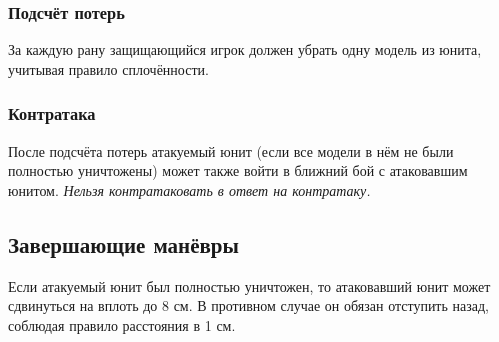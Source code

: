 \documentclass[twocolumn]{article}
\begin{document}
\subsubsection{Подсчёт потерь}
За каждую рану защищающийся игрок должен убрать одну модель из юнита, учитывая правило сплочённости.
\subsubsection{Контратака}
После подсчёта потерь атакуемый юнит (если все модели в нём не были полностью уничтожены) может также войти в ближний бой с атаковавшим юнитом. \emph{Нельзя контратаковать в ответ на контратаку.}

\subsection{Завершающие манёвры}
Если атакуемый юнит был полностью уничтожен, то атаковавший юнит может сдвинуться на вплоть до 8 см. В противном случае он обязан отступить назад, соблюдая правило расстояния в 1 см.
\end{document}
